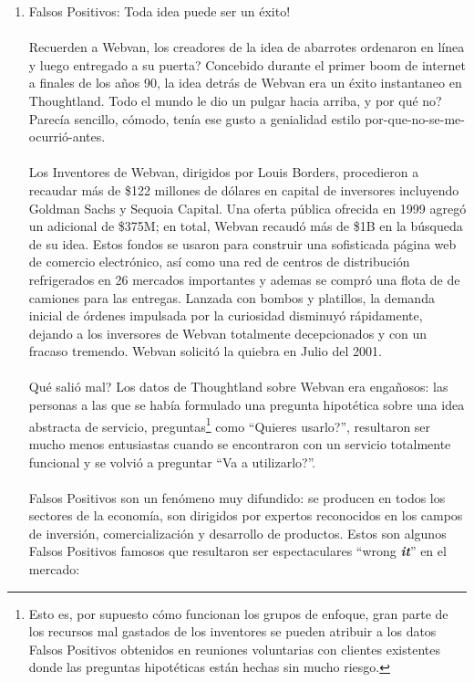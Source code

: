 \documentclass{article}
\begin{document}
\begin{enumerate}
  \item Falsos Positivos: Toda idea puede ser un \'exito!
  \\ \\
  Recuerden a Webvan, los creadores de la idea de abarrotes ordenaron en l\'inea y luego entregado a su puerta? Concebido durante el primer boom de internet a finales de los a\~nos 90, la idea detr\'as de Webvan era un \'exito instantaneo en Thoughtland. Todo el mundo le dio un pulgar hacia arriba, y por qu\'e no? Parec\'ia sencillo, c\'omodo, ten\'ia ese gusto a genialidad estilo por-que-no-se-me-ocurri\'o-antes.
\\ \\
Los Inventores de Webvan, dirigidos por Louis Borders, procedieron a recaudar m\'as de \$122 millones de d\'olares en capital de inversores incluyendo Goldman Sachs y Sequoia Capital. Una oferta p\'ublica ofrecida en 1999 agreg\'o un adicional de \$375M; en total, Webvan recaud\'o m\'as de \$1B en la b\'usqueda de su idea. Estos fondos se usaron para construir una sofisticada p\'agina web de comercio electr\'onico, as\'i como una red de centros de distribuci\'on refrigerados en 26 mercados importantes y ademas se compr\'o una flota de de camiones para las entregas. Lanzada con bombos y platillos, la demanda inicial de \'ordenes impulsada por la curiosidad disminuy\'o r\'apidamente, dejando a los inversores de Webvan totalmente decepcionados y con un fracaso tremendo. Webvan solicit\'o la quiebra en Julio del 2001.
\\ \\
Qu\'e sali\'o mal? Los datos de Thoughtland sobre Webvan era enga\~nosos: las personas a las que se hab\'ia formulado una pregunta hipot\'etica sobre una idea abstracta de servicio, preguntas\footnote{Esto es, por supuesto c\'omo funcionan los grupos de enfoque, gran parte de los recursos mal gastados de los inventores se pueden atribuir a los datos Falsos Positivos obtenidos en reuniones voluntarias con clientes existentes donde las preguntas hipot\'eticas est\'an hechas sin mucho riesgo.} como ``Quieres usarlo?'', resultaron ser mucho menos entusiastas cuando se encontraron con un servicio totalmente funcional y se volvi\'o a preguntar ``Va a utilizarlo?''.
\\ \\
Falsos Positivos son un fen\'omeno muy difundido: se producen en todos los sectores de la econom\'ia, son dirigidos por expertos reconocidos en los campos de inversi\'on, comercializaci\'on y desarrollo de productos. Estos son algunos Falsos Positivos famosos que resultaron ser espectaculares ``wrong \textbf{\textit{it}}'' en el mercado:


\end{enumerate}
\end{document}
